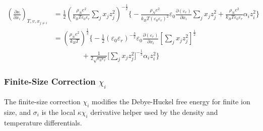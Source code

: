 \documentclass[12pt, letterpaper]{article}
\begin{document}

\begin{equation}
    \begin{aligned}
        \left(\frac{\partial\kappa}{\partial x_{i}}\right)_{T,v,x_{j\neq i}}
        &=
        \frac12
        \left(\frac{\rho_{N}e^{2}}{k_{B}T\varepsilon_{0}\varepsilon_{r}}\sum_{j}x_{j}z_{j}^{2}\right)^{-\frac12}
        \Biggl\{
            -\frac{\rho_{N}e^2}{k_{B}T\left(\varepsilon_{0}\varepsilon_{r}\right)^2}
            \varepsilon_{0}\frac{\partial\left(\varepsilon_{r}\right)}{\partial x_{i}}
            \sum_{j}x_{j}z_{j}^2
            +
            \frac{\rho_{N}e^2}{k_{B}T\varepsilon_{0}\varepsilon_{r}}
            \alpha_{i}z_{i}^2
        \Biggr\}
        \\
        &=
        \left(\frac{\rho_{N}e^{2}}{k_{B}T}\right)^{\frac{1}{2}}
        \Biggl\{
            -\frac{1}{2}\left(\varepsilon_{0}\varepsilon_{r}\right)^{-\frac{3}{2}}
            \varepsilon_{0}\frac{\partial\left(\varepsilon_{r}\right)}{\partial x_{i}}
            \left[\sum_{j}x_{j}z_{j}^{2}\right]^{\frac{1}{2}}
            \\
            &\qquad\qquad
            +
            \frac{1}{2\sqrt{\varepsilon_{0}\varepsilon_{r}}}
            \Biggl[\sum_{j}x_{j}z_{j}^2\Biggr]^{-\frac{1}{2}}
            \alpha_{i}z_{i}^2
        \Biggr\}
    \end{aligned}
    \label{eq:dkappa_dh_dxi}
\end{equation}

\subsubsection{Finite-Size Correction \(\chi_i\)}

The finite-size correction \(\chi_i\) modifies the Debye-Huckel free energy for finite ion size, and \(\sigma_i\) is the local \(\kappa\chi_i\) derivative helper used by the density and temperature differentials.
\end{document}
